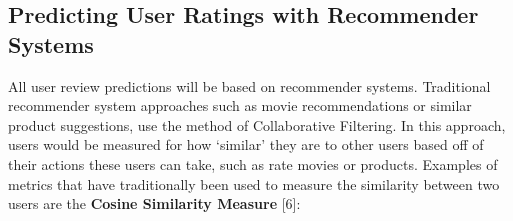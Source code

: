 \documentclass[10pt]{article}
\begin{document}
%
%
%
%
%

\subsection{Predicting User Ratings with Recommender Systems}

All user review predictions will be based on recommender systems. Traditional recommender system approaches such as movie recommendations or similar product suggestions, use the method of Collaborative Filtering. In this approach, users would be measured for how ‘similar’ they are to other users based off of their actions these users can take, such as rate movies or products. Examples of metrics that have traditionally been used to measure the similarity between two users are the \textbf{Cosine Similarity Measure} [6]:  
\end{document}
